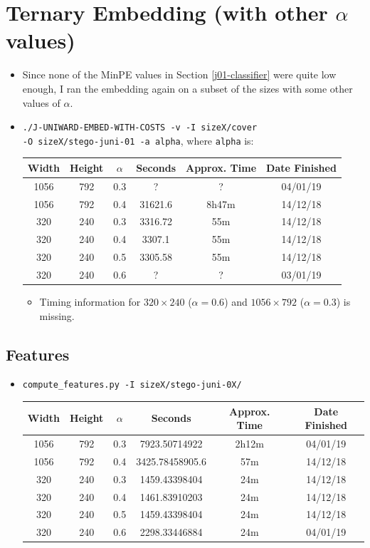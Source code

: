 \documentclass[11pt,a4paper]{report}
\begin{document}
\section{Ternary Embedding (with other \texorpdfstring{$\alpha$}{alpha} values)}
\begin{itemize}
\item Since none of the MinPE values in Section \ref{j01-classifier} were quite low enough, I ran the embedding again on a subset of the sizes with some other values of $\alpha$.
\item \texttt{./J-UNIWARD-EMBED-WITH-COSTS -v -I sizeX/cover} \\
         \texttt{-O sizeX/stego-juni-01 -a alpha}, where \texttt{alpha} is:
  \begin{center}
  \begin{tabular}{ c c | c | c c c }
  Width & Height & $\alpha$ & Seconds & Approx. Time & Date Finished \\ \hline
  1056 & 792 & 0.3 & ? & ? & 04/01/19 \\
  1056 & 792 & 0.4 & 31621.6 & 8h47m & 14/12/18 \\
  320 & 240 & 0.3 & 3316.72 & 55m & 14/12/18 \\
  320 & 240 & 0.4 & 3307.1 & 55m & 14/12/18 \\
  320 & 240 & 0.5 & 3305.58 & 55m & 14/12/18 \\
  320 & 240 & 0.6 & ? & ? & 03/01/19 \\
  \end{tabular}
  \end{center}
  \begin{itemize}
    \item Timing information for $320 \times 240$ ($\alpha = 0.6$) and $1056 \times 792$ ($\alpha = 0.3$) is missing.
  \end{itemize}
\end{itemize}

\subsection{Features}
\begin{itemize}
\item \texttt{compute\_features.py -I sizeX/stego-juni-0X/}
  \begin{center}
  \begin{tabular}{ c c | c | c c c }
  Width & Height & $\alpha$ & Seconds & Approx. Time & Date Finished \\ \hline
  1056 & 792 & 0.3 & 7923.50714922 & 2h12m & 04/01/19 \\
  1056 & 792 & 0.4 & 3425.78458905.6 & 57m & 14/12/18 \\
  320 & 240 & 0.3 & 1459.43398404 & 24m & 14/12/18 \\
  320 & 240 & 0.4 & 1461.83910203 & 24m & 14/12/18 \\
  320 & 240 & 0.5 & 1459.43398404 & 24m & 14/12/18 \\
  320 & 240 & 0.6 & 2298.33446884 & 24m & 04/01/19 \\
  \end{tabular}
  \end{center}
\end{itemize}
\end{document}

